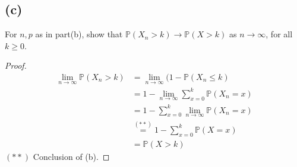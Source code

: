 \documentclass{article}
\newcommand{\prob}{\mathbb{P}}
\begin{document}
\subsection*{(c)}
For $n,p$ as in part(b), show that $\prob(X_n >k) \rightarrow \prob(X>k)$ as $n \rightarrow \infty$, for all $k\geq 0$.
\color{blue}
\begin{proof}
\begin{equation*}
    \begin{split}
        \lim_{n\rightarrow \infty}\prob(X_n>k) &= \lim_{n\rightarrow \infty}(1-\prob(X_n\leq k)\\
        &= 1-\lim_{n\rightarrow \infty}\sum_{x=0}^k\prob(X_n=x)\\
        &= 1-\sum_{x=0}^k\lim_{n\rightarrow \infty}\prob(X_n=x)\\
        &\stackrel{(**)}{=} 1-\sum_{x=0}^k\prob(X=x)\\
        &= \prob(X>k)
    \end{split}
\end{equation*}
$(**)$ Conclusion of (b).
\end{proof}
\end{document}

